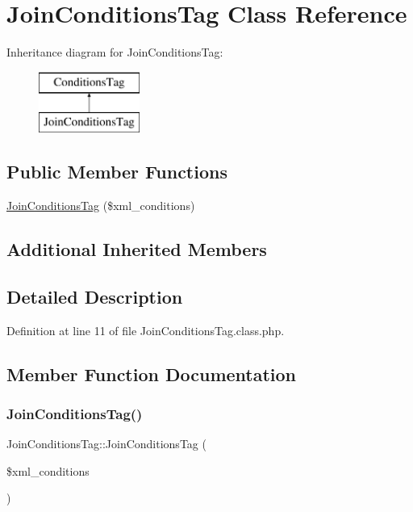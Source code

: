 \hypertarget{classJoinConditionsTag}{}\section{Join\+Conditions\+Tag Class Reference}
\label{classJoinConditionsTag}
Inheritance diagram for Join\+Conditions\+Tag\+:\begin{figure}[H]
\begin{center}
\leavevmode
\includegraphics[height=2.000000cm]{classJoinConditionsTag}
\end{center}
\end{figure}
\subsection*{Public Member Functions}
\begin{DoxyCompactItemize}
\item 
\hyperlink{classJoinConditionsTag_aa482f0c93e57933796566139e1b74f0e}{Join\+Conditions\+Tag} (\$xml\+\_\+conditions)
\end{DoxyCompactItemize}
\subsection*{Additional Inherited Members}


\subsection{Detailed Description}


Definition at line 11 of file Join\+Conditions\+Tag.\+class.\+php.



\subsection{Member Function Documentation}
\hypertarget{classJoinConditionsTag_aa482f0c93e57933796566139e1b74f0e}{}\label{classJoinConditionsTag_aa482f0c93e57933796566139e1b74f0e} 
\subsubsection{\texorpdfstring{Join\+Conditions\+Tag()}{JoinConditionsTag()}}
{\footnotesize\ttfamily Join\+Conditions\+Tag\+::\+Join\+Conditions\+Tag (\begin{DoxyParamCaption}\item[{}]{\$xml\+\_\+conditions }\end{DoxyParamCaption})}


